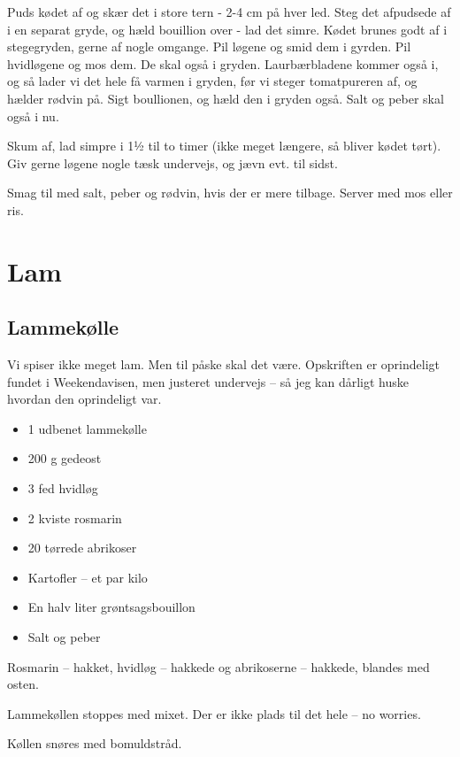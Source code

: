\documentclass[
]{book}
\providecommand{\tightlist}{%
  \setlength{\itemsep}{0pt}\setlength{\parskip}{0pt}}
\begin{document}
Puds kødet af og skær det i store tern - 2-4 cm på hver led.
Steg det afpudsede af i en separat gryde, og hæld bouillion over - lad det
simre.
Kødet brunes godt af i stegegryden, gerne af nogle omgange.
Pil løgene og smid dem i gyrden.
Pil hvidløgene og mos dem. De skal også i gryden.
Laurbærbladene kommer også i, og så lader vi det hele få varmen i gryden,
før vi steger tomatpureren af, og hælder rødvin på.
Sigt boullionen, og hæld den i gryden også. Salt og peber skal også i nu.

Skum af, lad simpre i 1½ til to timer (ikke meget længere, så bliver kødet
tørt). Giv gerne løgene nogle tæsk undervejs, og jævn evt. til sidst.

Smag til med salt, peber og rødvin, hvis der er mere tilbage. Server med mos eller
ris.

\hypertarget{lam}{%
\chapter{Lam}\label{lam}}

\hypertarget{lammekuxf8lle}{%
\section{Lammekølle}\label{lammekuxf8lle}}

Vi spiser ikke meget lam. Men til påske skal det være. Opskriften er oprindeligt fundet i Weekendavisen, men justeret undervejs -- så jeg kan dårligt huske hvordan den oprindeligt var.

\begin{itemize}
\tightlist
\item
  1 udbenet lammekølle
\item
  200 g gedeost
\item
  3 fed hvidløg
\item
  2 kviste rosmarin
\item
  20 tørrede abrikoser
\item
  Kartofler -- et par kilo
\item
  En halv liter grøntsagsbouillon
\item
  Salt og peber
\end{itemize}

Rosmarin -- hakket, hvidløg -- hakkede og abrikoserne -- hakkede, blandes med osten.

Lammekøllen stoppes med mixet. Der er ikke plads til det hele -- no worries.

Køllen snøres med bomuldstråd.
\end{document}
